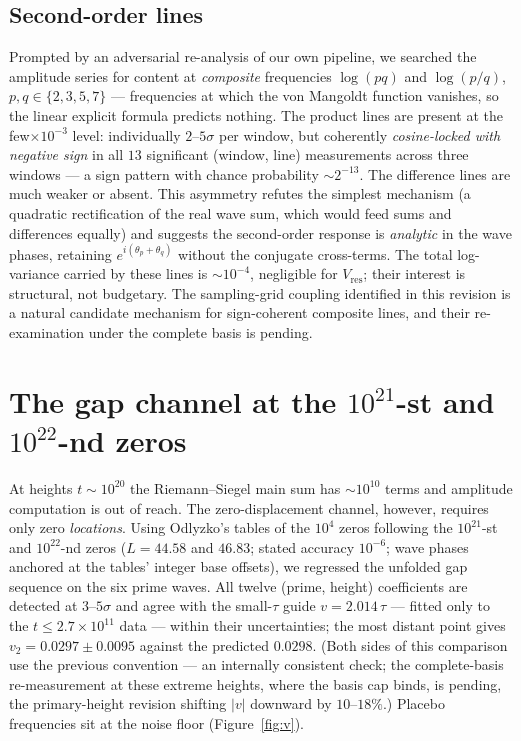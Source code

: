 \documentclass[12pt]{amsart}
\begin{document}
\subsection*{Second-order lines}
Prompted by an adversarial re-analysis of our own pipeline, we searched
the amplitude series for content at \emph{composite} frequencies
$\log(pq)$ and $\log(p/q)$, $p, q \in \{2,3,5,7\}$ --- frequencies at
which the von Mangoldt function vanishes, so the linear explicit formula
predicts nothing. The product lines are present at the few$\times10^{-3}$
level: individually $2$--$5\sigma$ per window, but coherently
\emph{cosine-locked with negative sign} in all $13$ significant
(window, line) measurements across three windows --- a sign pattern with
chance probability $\sim 2^{-13}$. The difference lines are much weaker
or absent. This asymmetry refutes the simplest mechanism (a quadratic
rectification of the real wave sum, which would feed sums and differences
equally) and suggests the second-order response is \emph{analytic} in the
wave phases, retaining $e^{i(\theta_p+\theta_q)}$ without the conjugate
cross-terms. The total log-variance carried by these lines is
$\sim 10^{-4}$, negligible for $V_{\mathrm{res}}$; their interest is
structural, not budgetary. The sampling-grid coupling identified in this
revision is a natural candidate mechanism for sign-coherent composite
lines, and their re-examination under the complete basis is pending.

\section{The gap channel at the $10^{21}$-st and $10^{22}$-nd zeros}

At heights $t \sim 10^{20}$ the Riemann--Siegel main sum has $\sim 10^{10}$
terms and amplitude computation is out of reach. The zero-displacement
channel, however, requires only zero \emph{locations}. Using Odlyzko's
tables of the $10^4$ zeros following the $10^{21}$-st and $10^{22}$-nd
zeros \cite{OdlyzkoTables} ($L = 44.58$ and $46.83$; stated accuracy
$10^{-6}$; wave phases anchored at the tables' integer base offsets), we
regressed the unfolded gap sequence on the six prime waves. All twelve
(prime, height) coefficients are detected at $3$--$5\sigma$ and agree with
the small-$\tau$ guide $v = 2.014\,\tau$ --- fitted only to the
$t \le 2.7\times10^{11}$ data --- within their uncertainties; the most
distant point gives $v_2 = 0.0297 \pm 0.0095$ against the predicted
$0.0298$. (Both sides of this comparison use the previous convention ---
an internally consistent check; the complete-basis re-measurement at
these extreme heights, where the basis cap binds, is pending, the
primary-height revision shifting $|v|$ downward by $10$--$18\%$.) Placebo frequencies sit at the noise floor
(Figure~\ref{fig:v}).
\end{document}
